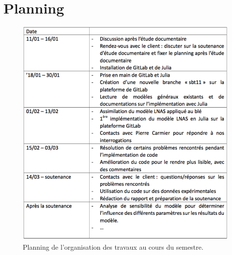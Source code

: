 \section{Planning}
\label{ann:planning}

\begin{figure}[H]
  \includegraphics[scale=0.51]{./img/planning.png}
  \caption{Planning de l'organisation des travaux au cours du semestre.}
  \label{fig:planning}
\end{figure}